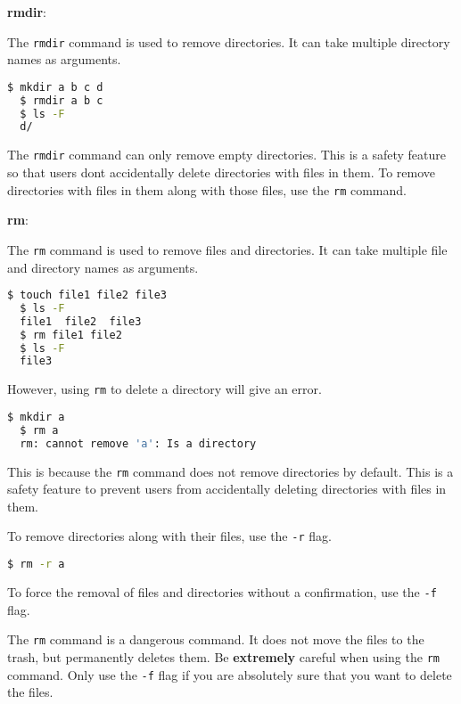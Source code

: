 \textbf{rmdir}:

The \texttt{rmdir} command is used to remove directories.
It can take multiple directory names as arguments.

\begin{lstlisting}[language=bash]
  $ mkdir a b c d
  $ rmdir a b c
  $ ls -F
  d/
\end{lstlisting}

\begin{remark}
  The \texttt{rmdir} command can only remove empty directories.
  This is a safety feature so that users dont accidentally delete directories with files in them.
  To remove directories with files in them along with those files, use the \texttt{rm} command.
\end{remark}

\textbf{rm}:

The \texttt{rm} command is used to remove files and directories.
It can take multiple file and directory names as arguments.

\begin{lstlisting}[language=bash]
  $ touch file1 file2 file3
  $ ls -F
  file1  file2  file3
  $ rm file1 file2
  $ ls -F
  file3
\end{lstlisting}

However, using \texttt{rm} to delete a directory will give an error.

\begin{lstlisting}[language=bash]
  $ mkdir a
  $ rm a
  rm: cannot remove 'a': Is a directory
\end{lstlisting}

This is because the \texttt{rm} command does not remove directories by default.
This is a safety feature to prevent users from accidentally deleting directories with files in them.

To remove directories along with their files, use the \texttt{-r} flag.

\begin{lstlisting}[language=bash]
  $ rm -r a
\end{lstlisting}

To force the removal of files and directories without a confirmation, use the \texttt{-f} flag.

\begin{warn}
  The \texttt{rm} command is a dangerous command.
  It does not move the files to the trash, but permanently deletes them.
  Be \textbf{extremely} careful when using the \texttt{rm} command.
  Only use the \texttt{-f} flag if you are absolutely sure that you want to delete the files.
\end{warn}

